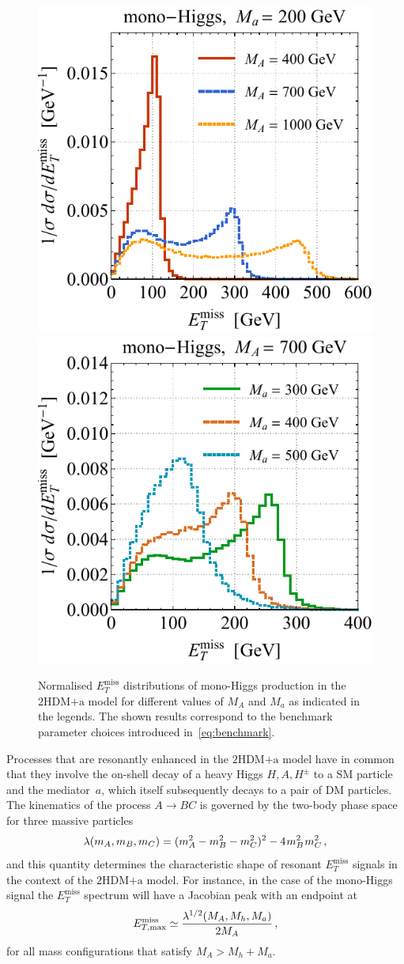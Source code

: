 \documentclass[a4paper, 11pt,notoc]{article}
\newcommand{\MET}{\ensuremath{E_T^\mathrm{miss}}\xspace}
\newcommand{\mA}{\ensuremath{M_{A}}\xspace}
\newcommand{\ma}{\ensuremath{M_{a}}\xspace}
\newcommand{\hdma}{\ensuremath{\textrm{2HDM+a}}\xspace}
\begin{document}
\begin{figure}[t!]
\centering
\includegraphics[height=0.45\textwidth]{hmetspecl.pdf}	\qquad 
\includegraphics[height=0.45\textwidth]{hmetspecr.pdf}
\vspace{2mm}
\caption{\label{fig:hMET} Normalised $\MET$ distributions of mono-Higgs production in the \hdma model for different values of $\mA$ and $\ma$ as indicated in the legends. The shown results correspond to the benchmark parameter choices introduced in~\eqref{eq:benchmark}. }  
\end{figure}

Processes that are resonantly enhanced in the \hdma model have in common that they involve the on-shell decay of a heavy Higgs $H,A,H^\pm$ to a SM particle and the mediator~$a$, which   itself  subsequently decays to a pair of DM particles. The kinematics of the process $A \to B C$ is governed by the two-body phase space for three massive particles 
\begin{equation} \label{eq:twophasespace}
\lambda(m_A, m_B, m_C) = (m_A^2 -m_B^2-m_C^2)^2 -  4 \hspace{0.25mm} m_B^2 \hspace{0.25mm}  m_C^2 \,,
\end{equation}
and this quantity determines the characteristic shape of resonant $\MET$ signals in the context of the \hdma model. For instance, in the case of the mono-Higgs signal the $\MET$ spectrum  will have a Jacobian peak with an endpoint at~\cite{No:2015xqa,Bauer:2017ota}
\begin{equation} \label{eq:monoHMETpeak}
E^{\rm{miss}}_{T, {\rm max} } \simeq \frac{\lambda^{1/2}(M_A, M_h, M_a)}{2 M_A}\,, 
\end{equation}
for all mass configurations that satisfy $M_A > M_h + M_a$. 
\end{document}
